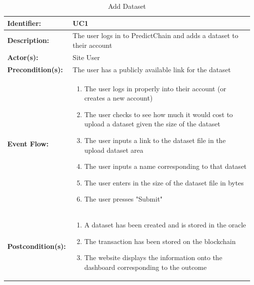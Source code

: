 \documentclass{article}
\begin{document}
    \begin{table}[H]
        \caption{Add Dataset}
        \label{tab:add-ds}
        \centering
        \begin{tabular}{|p{3cm}|p{12cm}|}
            \hline
            \textbf{Identifier:} & UC1 \\
            \hline
            \textbf{Description:} & The user logs in to PredictChain and adds a dataset to their account\\
            \hline
            \textbf{Actor(s):} & Site User \\
            \hline
            \textbf{Precondition(s):} & The user has a publicly available link for the dataset\\
            \hline
            \textbf{Event Flow:} &
            \begin{enumerate}
                \item The user logs in properly into their account (or creates a new account)
                \item The user checks to see how much it would cost to upload a dataset given the size of the dataset
                \item The user inputs a link to the dataset file in the upload dataset area
                \item The user inputs a name corresponding to that dataset
                \item The user enters in the size of the dataset file in bytes
                \item The user presses "Submit"
            \end{enumerate} \\
            \hline
            \textbf{Postcondition(s):} &
            \begin{enumerate}
                \item A dataset has been created and is stored in the oracle
                \item The transaction has been stored on the blockchain
                \item The website displays the information onto the dashboard corresponding to the outcome
            \end{enumerate}\\
            \hline
        \end{tabular}
    \end{table}
\end{document}

